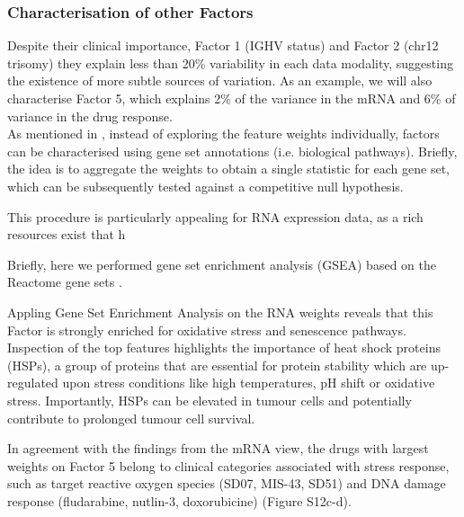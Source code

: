 \subsubsection{Characterisation of other Factors}

Despite their clinical importance, Factor 1 (IGHV status) and Factor 2 (chr12 trisomy) they explain less than 20\% variability in each data modality, suggesting the existence of more subtle sources of variation. As an example, we will also characterise Factor 5, which explains 2\% of the variance in the mRNA and 6\% of variance in the drug response.\\
As mentioned in , instead of exploring the feature weights individually, factors can be characterised using gene set annotations (i.e. biological pathways). Briefly, the idea is to aggregate the weights to obtain a single statistic for each gene set, which can be subsequently tested against a competitive null hypothesis.

This procedure is particularly appealing for RNA expression data, as a rich resources exist that h

Briefly, here we performed gene set enrichment analysis (GSEA) based on the Reactome gene sets \cite{Fabregat2015}.



Appling Gene Set Enrichment Analysis on the RNA weights reveals that this Factor is strongly enriched for oxidative stress and senescence pathways. Inspection of the top features highlights the importance of heat shock proteins (HSPs), a group of proteins that are essential for protein stability which are up-regulated upon stress conditions like high temperatures, pH shift or oxidative stress. Importantly, HSPs can be elevated in tumour cells and potentially contribute to prolonged tumour cell survival\cite{Dempsey2010}.

In agreement with the findings from the mRNA view, the drugs with largest weights on Factor 5 belong to clinical categories associated with stress response, such as target reactive oxygen species (SD07, MIS-43, SD51) and DNA damage response (fludarabine, nutlin-3, doxorubicine) (Figure S12c-d).


